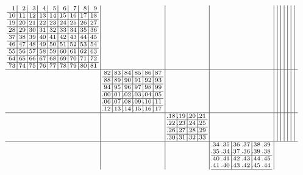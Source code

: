 \documentclass[10pt,a4paper,landscape]{amsart}
\begin{document}
\begin{align*}\scriptsize\arraycolsep2pt
\begin{array}{c|c|c|c|c|c|c|c|c|c|c}
\begin{array}{r|r|r|r|r|r|r|r|r}%
1&2&3&4&5&6&7&8&9\\\hline%
10&11&12&13&14&15&16&17&18\\\hline%
19&20&21&22&23&24&25&26&27\\\hline%
28&29&30&31&32&33&34&35&36\\\hline%
37&38&39&40&41&42&43&44&45\\\hline%
46&47&48&49&50&51&52&53&54\\\hline%
55&56&57&58&59&60&61&62&63\\\hline%
64&65&66&67&68&69&70&71&72\\\hline%
73&74&75&76&77&78&79&80&81\\%
\end{array}%
&&&&&&&&&&\\\hline
&
\begin{array}{r|r|r|r|r|r}%
82&83&84&85&86&87\\\hline%
88&89&90&91&92&93\\\hline%
94&95&96&97&98&99\\\hline%
\llap.00&\llap.01&\llap.02&\llap.03&\llap.04&\llap.05\\\hline%
\llap.06&\llap.07&\llap.08&\llap.09&\llap.10&\llap.11\\\hline%
\llap.12&\llap.13&\llap.14&\llap.15&\llap.16&\llap.17\\%
\end{array}%
&&&&&&&&&\\\hline
&&
\begin{array}{r|r|r|r}%
\llap.18&\llap.19&\llap.20&\llap.21\\\hline%
\llap.22&\llap.23&\llap.24&\llap.25\\\hline%
\llap.26&\llap.27&\llap.28&\llap.29\\\hline%
\llap.30&\llap.31&\llap.32&\llap.33\\%
\end{array}%
&&&&&&&&\\\hline
&&&
\begin{array}{rr|rr|rr}%
\llap.34&\llap.35&\llap.36&\llap.37&\llap.38&\llap.39\\%
\llap.35&\llap.34&\llap.37&\llap.36&\llap.39&\llap.38\\\hline%
\llap.40&\llap.41&\llap.42&\llap.43&\llap.44&\llap.45\\%
\llap.41&\llap.40&\llap.43&\llap.42&\llap.45&\llap.44\\\hline%

\end{array}
\end{array}
\end{align*}
\end{document}
